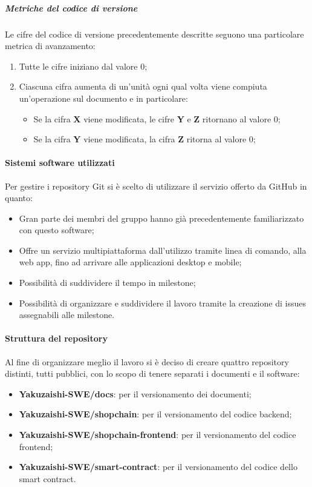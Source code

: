 \subparagraph{Metriche del codice di versione}
Le cifre del codice di versione precedentemente descritte seguono una particolare metrica di avanzamento:
\begin{enumerate}
    \item Tutte le cifre iniziano dal valore 0;
    \item Ciascuna cifra aumenta di un'unità ogni qual volta viene compiuta un'operazione sul documento e in particolare:
          \begin{itemize}
              \item Se la cifra \textbf{X} viene modificata, le cifre \textbf{Y} e \textbf{Z} ritornano al valore 0;
              \item Se la cifra \textbf{Y} viene modificata, la cifra \textbf{Z} ritorna al valore 0;
          \end{itemize}
\end{enumerate}

\paragraph{Sistemi software utilizzati}
Per gestire i repository\glo{} Git\glo{} si è scelto di utilizzare il servizio offerto da GitHub\glo{} in quanto:
\begin{itemize}
    \item Gran parte dei membri del gruppo hanno già precedentemente familiarizzato con questo software;
    \item Offre un servizio multipiattaforma dall'utilizzo tramite linea di comando, alla web app\glo{}, fino ad arrivare alle applicazioni desktop e mobile;
    \item Possibilità di suddividere il tempo in milestone\glo{};
    \item Possibilità di organizzare e suddividere il lavoro tramite la creazione di issues\glo{} assegnabili alle milestone\glo{}.
\end{itemize}


\paragraph{Struttura del repository}\label{paragraph: repository}
Al fine di organizzare meglio il lavoro si è deciso di creare quattro repository\glo{} distinti, tutti pubblici, con lo scopo di tenere separati i documenti e il software:
\begin{itemize}
    \item \textbf{Yakuzaishi-SWE/docs}: per il versionamento dei documenti;
    \item \textbf{Yakuzaishi-SWE/shopchain}: per il versionamento del codice backend\glo{};
    \item \textbf{Yakuzaishi-SWE/shopchain-frontend}: per il versionamento del codice frontend\glo{};
    \item \textbf{Yakuzaishi-SWE/smart-contract}: per il versionamento del codice dello smart contract\glo{}.

\end{itemize}


